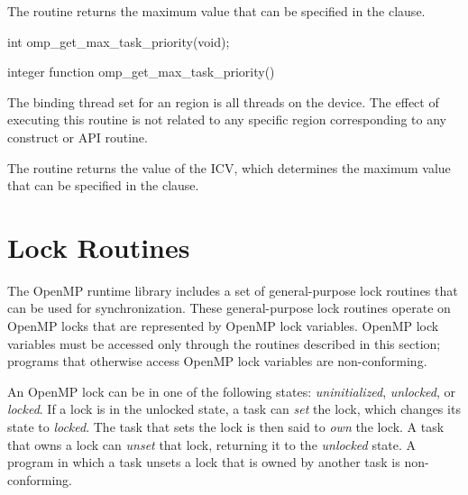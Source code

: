 The  routine returns the maximum value that can be
specified in the  clause.

\begin{samepage}
\format
\ccppspecificstart
\begin{boxedcode}
int omp\_get\_max\_task\_priority(void);
\end{boxedcode}
\ccppspecificend
\end{samepage}

\fortranspecificstart
\begin{boxedcode}
integer function omp\_get\_max\_task\_priority()
\end{boxedcode}
\fortranspecificend

\binding

The binding thread set for an  region is all threads
on the device. The effect of executing this routine is not related to any specific region
corresponding to any construct or API routine.

\effect

The  routine returns the value of the 
ICV, which determines the maximum value that can be specified in the  clause.










\newpage
\section{Lock Routines}
\label{sec:Lock Routines}
The OpenMP runtime library includes a set of general-purpose lock routines that can be 
used for synchronization. These general-purpose lock routines operate on OpenMP locks 
that are represented by OpenMP lock variables. OpenMP lock variables must be 
accessed only through the routines described in this section; programs that otherwise 
access OpenMP lock variables are non-conforming.

An OpenMP lock can be in one of the following states: \emph{uninitialized}, \emph{unlocked}, or 
\emph{locked}. If a lock is in the unlocked state, a task can \emph{set} the lock, which changes its state 
to \emph{locked}. The task that sets the lock is then said to \emph{own} the lock. A task that owns a 
lock can \emph{unset} that lock, returning it to the \emph{unlocked} state. A program in which a task 
unsets a lock that is owned by another task is non-conforming.

